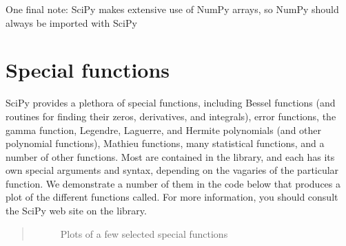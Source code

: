 \documentclass[letterpaper,10pt,english]{sphinxmanual}
\begin{document}
One final note:  SciPy makes extensive use of NumPy arrays, so NumPy should always be imported with SciPy


\section{Special functions}
\label{chap9/chap9_scipy:index-0}\label{chap9/chap9_scipy:specfunc}\label{chap9/chap9_scipy:special-functions}
SciPy provides a plethora of special functions, including Bessel functions (and routines for finding their zeros, derivatives, and integrals), error functions, the gamma function, Legendre, Laguerre, and Hermite polynomials (and other polynomial functions), Mathieu functions, many statistical functions, and a number of other functions.  Most are contained in the  library, and each has its own special arguments and syntax, depending on the vagaries of the particular function.  We demonstrate a number of them in the code below that produces a plot of the different functions called.  For more information, you should consult the SciPy web site on the  library.
\begin{quote}
\begin{figure}[htbp]
\centering
\capstart

\caption{Plots of a few selected special functions}\label{chap9/chap9_scipy:fig-specfuncplots}\end{figure}
\end{quote}
\end{document}
